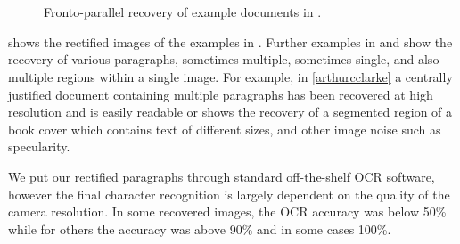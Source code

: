 \begin{figure}[t]
\centering
\begin{center}
\hspace{2mm}\\
\\
\end{center}
\caption{Fronto-parallel recovery of example documents in .}
\label{pprecover}
\end{figure}

 shows the rectified images of the examples in
. Further examples in  and 
 show the recovery of various paragraphs, sometimes
multiple, sometimes single, and also multiple regions within a single image. 
For example, in \ref{arthurcclarke} a centrally justified document containing
multiple paragraphs has been recovered at high resolution and is easily readable
or  shows the recovery of a segmented region of a book cover
which contains text of different sizes, and other image noise such as specularity.

We put our rectified paragraphs through standard off-the-shelf OCR software,
however the final character recognition is largely dependent on the quality of
the camera resolution. In some recovered images, the OCR accuracy was below 50\%
while for others the accuracy was above 90\% and in some cases 100\%.

